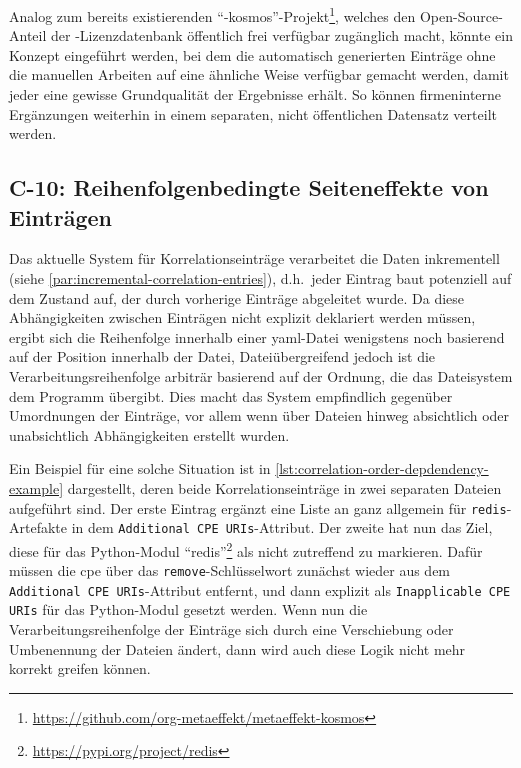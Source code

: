 Analog zum bereits existierenden \enquote{\metaeffekt-kosmos}-Projekt\footnote{\url{https://github.com/org-metaeffekt/metaeffekt-kosmos}}, welches den Open-Source-Anteil der \metaeffekt-Lizenzdatenbank öffentlich frei verfügbar zugänglich macht, könnte ein Konzept eingeführt werden, bei dem die automatisch generierten Einträge ohne die manuellen Arbeiten auf eine ähnliche Weise verfügbar gemacht werden, damit jeder eine gewisse Grundqualität der Ergebnisse erhält.
So können firmeninterne Ergänzungen weiterhin in einem separaten, nicht öffentlichen Datensatz verteilt werden.

\subsection{C-10: Reihenfolgenbedingte Seiteneffekte von Einträgen}\label{subsec:c-10-order-dependency}


Das aktuelle System für Korrelationseinträge verarbeitet die Daten inkrementell (siehe \autoref{par:incremental-correlation-entries}), d.h.\ jeder Eintrag baut potenziell auf dem Zustand auf, der durch vorherige Einträge abgeleitet wurde.
Da diese Abhängigkeiten zwischen Einträgen nicht explizit deklariert werden müssen, ergibt sich die Reihenfolge innerhalb einer \acrshort{yaml}-Datei wenigstens noch basierend auf der Position innerhalb der Datei, Dateiübergreifend jedoch ist die Verarbeitungsreihenfolge arbiträr basierend auf der Ordnung, die das Dateisystem dem Programm übergibt.
Dies macht das System empfindlich gegenüber Umordnungen der Einträge, vor allem wenn über Dateien hinweg absichtlich oder unabsichtlich Abhängigkeiten erstellt wurden.

Ein Beispiel für eine solche Situation ist in \autoref{lst:correlation-order-depdendency-example} dargestellt, deren beide Korrelationseinträge in zwei separaten Dateien aufgeführt sind.
Der erste Eintrag ergänzt eine Liste an  ganz allgemein für \texttt{redis}-Artefakte in dem \texttt{Additional CPE URIs}-Attribut.
Der zweite hat nun das Ziel, diese für das Python-Modul \enquote{redis}\footnote{\url{https://pypi.org/project/redis}} als nicht zutreffend zu markieren.
Dafür müssen die \acrshort{cpe} über das \texttt{remove}-Schlüsselwort zunächst wieder aus dem \texttt{Additional CPE URIs}-Attribut entfernt, und dann explizit als \texttt{Inapplicable CPE URIs} für das Python-Modul gesetzt werden.
Wenn nun die Verarbeitungsreihenfolge der Einträge sich durch eine Verschiebung oder Umbenennung der Dateien ändert, dann wird auch diese Logik nicht mehr korrekt greifen können.

